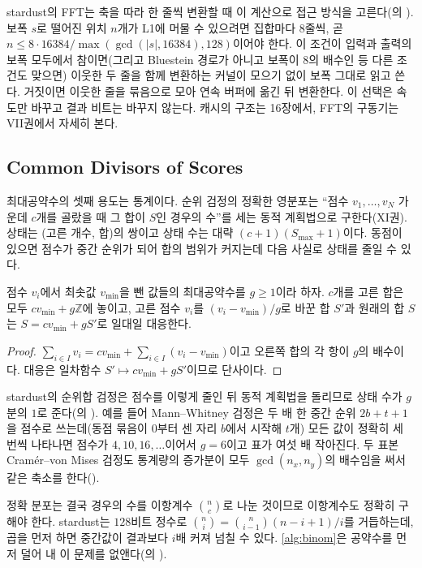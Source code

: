 stardust의 FFT는 축을 따라 한 줄씩 변환할 때 이 계산으로 접근 방식을 고른다(의 ). 보폭 $s$로 떨어진 위치 $n$개가 L1에 머물 수 있으려면 집합마다 $8$줄씩, 곧 $n\le8\cdot16384/\max(\gcd(|s|,16384),128)$이어야 한다. 이 조건이 입력과 출력의 보폭 모두에서 참이면(그리고 Bluestein 경로가 아니고 보폭이 $8$의 배수인 등 다른 조건도 맞으면) 이웃한 두 줄을 함께 변환하는 커널이 모으기 없이 보폭 그대로 읽고 쓴다. 거짓이면 이웃한 줄을 묶음으로 모아 연속 버퍼에 옮긴 뒤 변환한다. 이 선택은 속도만 바꾸고 결과 비트는 바꾸지 않는다. 캐시의 구조는 16장에서, FFT의 구동기는 VII권에서 자세히 본다.

\subsection{Common Divisors of Scores}

최대공약수의 셋째 용도는 통계이다. 순위 검정의 정확한 영분포는 ``점수 $v_1,\dots,v_N$ 가운데 $c$개를 골랐을 때 그 합이 $S$인 경우의 수''를 세는 동적 계획법으로 구한다(XI권). 상태는 (고른 개수, 합)의 쌍이고 상태 수는 대략 $(c+1)(S_{\max}+1)$이다. 동점이 있으면 점수가 중간 순위가 되어 합의 범위가 커지는데 다음 사실로 상태를 줄일 수 있다.

\begin{proposition}
\label{prop:score-lattice}
점수 $v_i$에서 최솟값 $v_{\min}$을 뺀 값들의 최대공약수를 $g\ge1$이라 하자. $c$개를 고른 합은 모두 $cv_{\min}+g\mathbb{Z}$에 놓이고, 고른 점수 $v_i$를 $(v_i-v_{\min})/g$로 바꾼 합 $S'$과 원래의 합 $S$는 $S=cv_{\min}+gS'$로 일대일 대응한다.
\end{proposition}

\begin{proof}
$\sum_{i\in I}v_i=cv_{\min}+\sum_{i\in I}(v_i-v_{\min})$이고 오른쪽 합의 각 항이 $g$의 배수이다. 대응은 일차함수 $S'\mapsto cv_{\min}+gS'$이므로 단사이다.
\end{proof}

stardust의 순위합 검정은 점수를 이렇게 줄인 뒤 동적 계획법을 돌리므로 상태 수가 $g$분의 $1$로 준다(의 ). 예를 들어 Mann–Whitney 검정은 두 배 한 중간 순위 $2b+t+1$을 점수로 쓰는데(동점 묶음이 $0$부터 센 자리 $b$에서 시작해 $t$개) 모든 값이 정확히 세 번씩 나타나면 점수가 $4,10,16,\dots$이어서 $g=6$이고 표가 여섯 배 작아진다. 두 표본 Cramér–von Mises 검정도 통계량의 증가분이 모두 $\gcd(n_x,n_y)$의 배수임을 써서 같은 축소를 한다().

정확 분포는 결국 경우의 수를 이항계수 $\binom{n}{c}$로 나눈 것이므로 이항계수도 정확히 구해야 한다. stardust는 $128$비트 정수로 $\binom{n}{i}=\binom{n}{i-1}(n-i+1)/i$를 거듭하는데, 곱을 먼저 하면 중간값이 결과보다 $i$배 커져 넘칠 수 있다. \cref{alg:binom}은 공약수를 먼저 덜어 내 이 문제를 없앤다(의 ).

